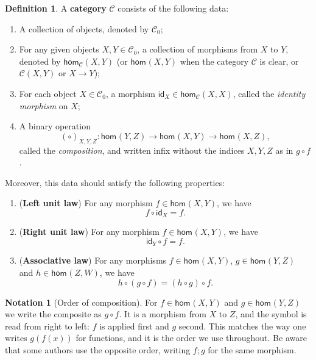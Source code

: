 \documentclass[a4paper,11pt, oneside,titlepage=false]{scrbook}
\theoremstyle{plain}
\theoremstyle{definition}
\newtheorem{dfn}[thm]{Definition}
\newtheorem{nota}[thm]{Notation}
\newcommand{\cfont}[1]{\ensuremath{\mathsf{#1}}}
\newcommand{\Cat}[1]{\mathcal{#1}}
\newcommand{\CC}{\Cat{C}}
\newcommand{\Ob}[1]{{#1}_0}
\newcommand{\Hom}[3][]{\cfont{hom}_{#1}(#2,#3)}
\newcommand{\CHom}[3]{{#1}(#2,#3)}
\newcommand{\Id}[1][]{\cfont{id}_{#1}}
\newcommand{\co}[2]{\ensuremath{#2 \circ #1}}
\begin{document}
\begin{dfn}\label{dfn:category}
  A \textbf{category} $\CC$ consists of the following data:
\begin{enumerate}
\item A collection of objects, denoted by $\Ob{\CC}$;
\item For any given objects $X,Y \in \Ob{\CC}$, a collection of morphisms from $X$ to $Y$, denoted by $\Hom[\CC]{X}{Y}$ (or $\Hom{X}{Y}$ when the category $\CC$ is clear, or $\CHom \CC X Y$ or $X \to Y$);
\item For each object $X\in \Ob{\CC}$, a morphism $\Id[X] \in \Hom[\CC]{X}{X}$, called the \emph{identity morphism} on $X$;
\item A binary operation
\[
(\co{}{})_{X,Y,Z} : \Hom{Y}{Z} \to \Hom X Y \to \Hom X Z,
\]
called the \emph{composition}, and written infix without the indices $X,Y,Z$ as in $\co{f}{g}$.
\end{enumerate}
Moreover, this data should satisfy the following properties:
\begin{enumerate}
\item (\textbf{Left unit law}) For any morphism $f \in \Hom X Y$, we have
\[
 \co{\Id[X]} {f} = f.
\]
\item (\textbf{Right unit law}) For any morphism $f \in \Hom X Y$, we have
\[
  \co f {\Id[Y]} = f.
\]
\item (\textbf{Associative law}) For any morphisms $f\in \Hom X Y$, $g\in \Hom Y Z$ and $h\in \Hom Z W$, we have
\[
     \co {(\co f g)}{h} =  \co f {(\co g  h)}.
\]
\end{enumerate}
\end{dfn}

\begin{nota}[Order of composition]
  For $f \in \Hom X Y$ and $g \in \Hom Y Z$ we write the composite as
  $\co f g$.
  It is a morphism from $X$ to $Z$, and the symbol is read from right to left:
  $f$ is applied first and $g$ second.
  This matches the way one writes $g(f(x))$ for functions, and it is the order
  we use throughout.
  Be aware that some authors use the opposite order, writing $f ; g$ for the
  same morphism.
\end{nota}
\end{document}
